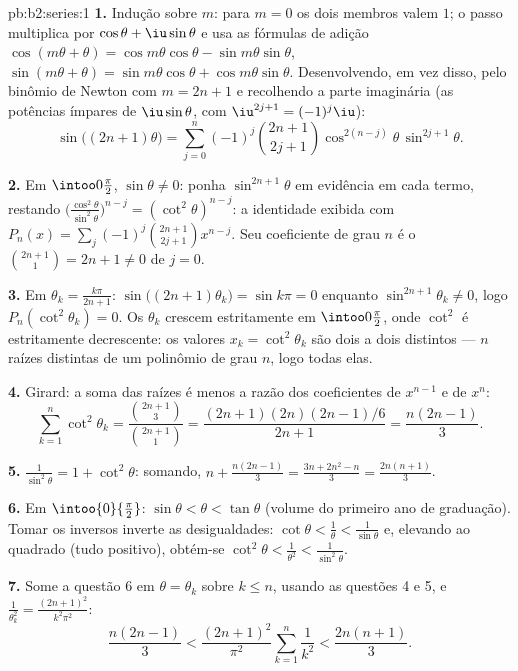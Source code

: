 \begin{solution}{pb:b2:series:1}
\textbf{1.} Indução sobre $m$: para $m = 0$ os dois membros valem $1$;
o passo multiplica por $\cos\theta + \iu\sin\theta$ e usa as
fórmulas de adição $\cos(m\theta + \theta) =
\cos m\theta\cos\theta - \sin m\theta\sin\theta$, $\sin(m\theta
+ \theta) = \sin m\theta\cos\theta + \cos m\theta\sin\theta$.
Desenvolvendo, em vez disso, pelo binômio de Newton com $m = 2n+1$ e
recolhendo a parte imaginária (as potências ímpares de
$\iu\sin\theta$, com $\iu^{2j+1} = (-1)^j\iu$):
\[
\sin\bigl((2n{+}1)\theta\bigr) = \sum_{j=0}^{n}(-1)^j
\binom{2n+1}{2j+1}\cos^{2(n-j)}\theta\,\sin^{2j+1}\theta .
\]

\textbf{2.} Em $\intoo0{\frac\pi2}$, $\sin\theta \neq 0$: ponha
$\sin^{2n+1}\theta$ em evidência em cada termo, restando
$\bigl(\frac{\cos^2\theta}{\sin^2\theta}\bigr)^{n-j} =
(\cot^2\theta)^{n-j}$: a identidade exibida com $P_n(x) =
\sum_j(-1)^j\binom{2n+1}{2j+1}x^{n-j}$. Seu coeficiente
de grau $n$ é o $\binom{2n+1}{1} = 2n + 1 \neq 0$ de $j = 0$.

\textbf{3.} Em $\theta_k = \frac{k\pi}{2n+1}$:
$\sin\bigl((2n{+}1)\theta_k\bigr) = \sin k\pi = 0$ enquanto
$\sin^{2n+1}\theta_k \neq 0$, logo $P_n(\cot^2\theta_k) = 0$. Os
$\theta_k$ crescem estritamente em $\intoo0{\frac\pi2}$, onde
$\cot^2$ é estritamente decrescente: os valores $x_k =
\cot^2\theta_k$ são dois a dois distintos --- $n$ raízes distintas de
um polinômio de grau $n$, logo todas elas.

\textbf{4.} Girard: a soma das raízes é menos a razão dos
coeficientes de $x^{n-1}$ e de $x^n$:
\[
\sum_{k=1}^{n}\cot^2\theta_k =
\frac{\binom{2n+1}{3}}{\binom{2n+1}{1}}
= \frac{(2n+1)(2n)(2n-1)/6}{2n+1} = \frac{n(2n-1)}{3}.
\]

\textbf{5.} $\frac{1}{\sin^2\theta} = 1 + \cot^2\theta$:
somando, $n + \frac{n(2n-1)}3 = \frac{3n + 2n^2 - n}{3} =
\frac{2n(n+1)}{3}$.

\textbf{6.} Em $\intoo{0}{\frac\pi2}$: $\sin\theta < \theta <
\tan\theta$ (volume do primeiro ano de graduação). Tomar os inversos inverte as desigualdades:
$\cot\theta < \frac1\theta < \frac1{\sin\theta}$ e, elevando ao quadrado
(tudo positivo), obtém-se $\cot^2\theta < \frac1{\theta^2} <
\frac1{\sin^2\theta}$.

\textbf{7.} Some a questão 6 em $\theta = \theta_k$ sobre $k \leq
n$, usando as questões 4 e 5, e $\frac1{\theta_k^2} =
\frac{(2n+1)^2}{k^2\pi^2}$:
\[
\frac{n(2n-1)}3 < \frac{(2n+1)^2}{\pi^2}\sum_{k=1}^n\frac1{k^2}
< \frac{2n(n+1)}3 .
\]


\end{solution}
